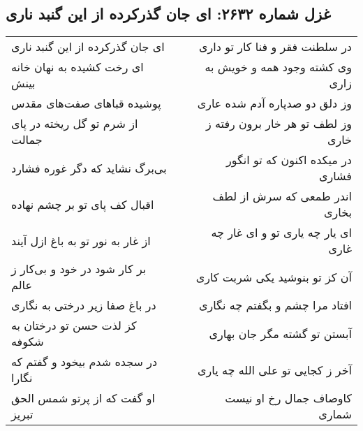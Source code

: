 \begin{center}
\section*{غزل شماره ۲۶۳۲: ای جان گذرکرده از این گنبد ناری}
\label{sec:2632}
\begin{longtable}{l p{0.5cm} r}
ای جان گذرکرده از این گنبد ناری
&&
در سلطنت فقر و فنا کار تو داری
\\
ای رخت کشیده به نهان خانه بینش
&&
وی کشته وجود همه و خویش به زاری
\\
پوشیده قباهای صفت‌های مقدس
&&
وز دلق دو صدپاره آدم شده عاری
\\
از شرم تو گل ریخته در پای جمالت
&&
وز لطف تو هر خار برون رفته ز خاری
\\
بی‌برگ نشاید که دگر غوره فشارد
&&
در میکده اکنون که تو انگور فشاری
\\
اقبال کف پای تو بر چشم نهاده
&&
اندر طمعی که سرش از لطف بخاری
\\
از غار به نور تو به باغ ازل آیند
&&
ای یار چه یاری تو و ای غار چه غاری
\\
بر کار شود در خود و بی‌کار ز عالم
&&
آن کز تو بنوشید یکی شربت کاری
\\
در باغ صفا زیر درختی به نگاری
&&
افتاد مرا چشم و بگفتم چه نگاری
\\
کز لذت حسن تو درختان به شکوفه
&&
آبستن تو گشته مگر جان بهاری
\\
در سجده شدم بیخود و گفتم که نگارا
&&
آخر ز کجایی تو علی الله چه یاری
\\
او گفت که از پرتو شمس الحق تبریز
&&
کاوصاف جمال رخ او نیست شماری
\\
\end{longtable}
\end{center}
